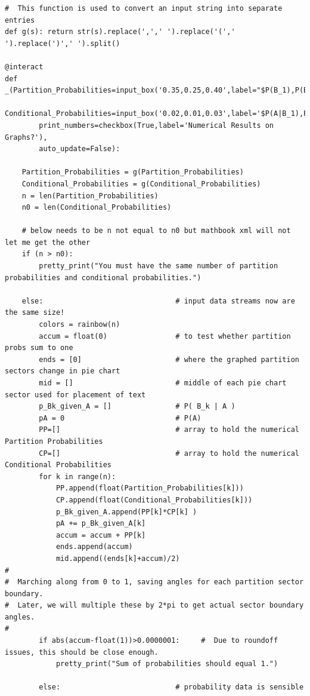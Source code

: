 \documentclass[10pt,]{book}
\theoremstyle{plain}
\theoremstyle{definition}
\theoremstyle{definition}
\theoremstyle{definition}
\numberwithin{equation}{section}
\begin{document}
\begin{lstlisting}[style=sageinput]
#  This function is used to convert an input string into separate entries
def g(s): return str(s).replace(',',' ').replace('(',' ').replace(')',' ').split()

@interact
def _(Partition_Probabilities=input_box('0.35,0.25,0.40',label="$P(B_1),P(B_2),...$"),
        Conditional_Probabilities=input_box('0.02,0.01,0.03',label='$P(A|B_1),P(A|B_2),...$'),
        print_numbers=checkbox(True,label='Numerical Results on Graphs?'),
        auto_update=False):
            
    Partition_Probabilities = g(Partition_Probabilities)
    Conditional_Probabilities = g(Conditional_Probabilities)
    n = len(Partition_Probabilities)
    n0 = len(Conditional_Probabilities)
    
    # below needs to be n not equal to n0 but mathbook xml will not let me get the other
    if (n > n0):
        pretty_print("You must have the same number of partition probabilities and conditional probabilities.")
        
    else:                               # input data streams now are the same size!
        colors = rainbow(n)
        accum = float(0)                # to test whether partition probs sum to one
        ends = [0]                      # where the graphed partition sectors change in pie chart 
        mid = []                        # middle of each pie chart sector used for placement of text
        p_Bk_given_A = []               # P( B_k | A )
        pA = 0                          # P(A)
        PP=[]                           # array to hold the numerical Partition Probabilities 
        CP=[]                           # array to hold the numerical Conditional Probabilities     
        for k in range(n):
            PP.append(float(Partition_Probabilities[k]))
            CP.append(float(Conditional_Probabilities[k]))    
            p_Bk_given_A.append(PP[k]*CP[k] )
            pA += p_Bk_given_A[k]
            accum = accum + PP[k]
            ends.append(accum)
            mid.append((ends[k]+accum)/2)
#
#  Marching along from 0 to 1, saving angles for each partition sector boundary.
#  Later, we will multiple these by 2*pi to get actual sector boundary angles.
#
        if abs(accum-float(1))>0.0000001:     #  Due to roundoff issues, this should be close enough.                     
            pretty_print("Sum of probabilities should equal 1.")
        
        else:                           # probability data is sensible
 

\end{lstlisting}
\end{document}
